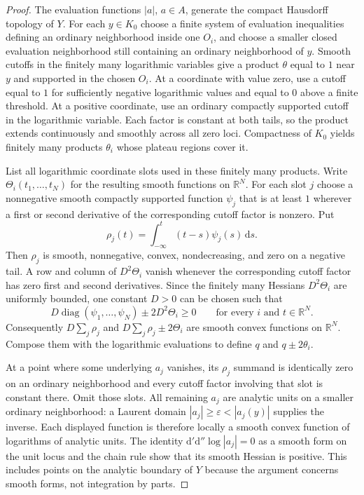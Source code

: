 \documentclass[11pt,a4paper]{amsart}
\begin{document}
\begin{proof}
The evaluation functions $|a|$, $a\in A$, generate the compact Hausdorff topology of $Y$. For each $y\in K_0$ choose a finite system of evaluation inequalities defining an ordinary neighborhood inside one $O_i$, and choose a smaller closed evaluation neighborhood still containing an ordinary neighborhood of $y$. Smooth cutoffs in the finitely many logarithmic variables give a product $\theta$ equal to $1$ near $y$ and supported in the chosen $O_i$. At a coordinate with value zero, use a cutoff equal to $1$ for sufficiently negative logarithmic values and equal to $0$ above a finite threshold. At a positive coordinate, use an ordinary compactly supported cutoff in the logarithmic variable. Each factor is constant at both tails, so the product extends continuously and smoothly across all zero loci. Compactness of $K_0$ yields finitely many products $\theta_i$ whose plateau regions cover it.

List all logarithmic coordinate slots used in these finitely many products. Write $\Theta_i(t_1,\ldots,t_N)$ for the resulting smooth functions on $\mathbb{R}^N$. For each slot $j$ choose a nonnegative smooth compactly supported function $\psi_j$ that is at least $1$ wherever a first or second derivative of the corresponding cutoff factor is nonzero. Put
\[
\rho_j(t)=\int_{-\infty}^{t}(t-s)\psi_j(s)\,\mathrm{d}s.
\]
Then $\rho_j$ is smooth, nonnegative, convex, nondecreasing, and zero on a negative tail. A row and column of $D^2\Theta_i$ vanish whenever the corresponding cutoff factor has zero first and second derivatives. Since the finitely many Hessians $D^2\Theta_i$ are uniformly bounded, one constant $D>0$ can be chosen such that
\[
D\operatorname{diag}(\psi_1,\ldots,\psi_N)\pm 2D^2\Theta_i\geq0
\qquad\text{for every }i\text{ and }t\in\mathbb{R}^N.
\]
Consequently $D\sum_j\rho_j$ and $D\sum_j\rho_j\pm2\Theta_i$ are smooth convex functions on $\mathbb{R}^N$. Compose them with the logarithmic evaluations to define $q$ and $q\pm2\theta_i$.

At a point where some underlying $a_j$ vanishes, its $\rho_j$ summand is identically zero on an ordinary neighborhood and every cutoff factor involving that slot is constant there. Omit those slots. All remaining $a_j$ are analytic units on a smaller ordinary neighborhood: a Laurent domain $|a_j|\geq\varepsilon<|a_j(y)|$ supplies the inverse. Each displayed function is therefore locally a smooth convex function of logarithms of analytic units. The identity $\mathrm{d}'\mathrm{d}''\log|a_j|=0$ as a smooth form on the unit locus \cite[Lemma~16.7.4]{CLD12} and the chain rule show that its smooth Hessian is positive. This includes points on the analytic boundary of $Y$ because the argument concerns smooth forms, not integration by parts.
\end{proof}
\end{document}
